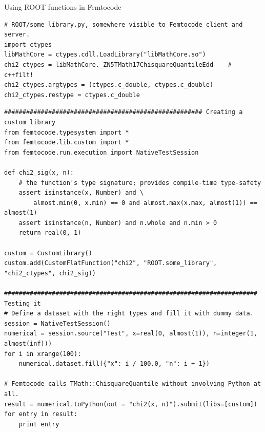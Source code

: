 \documentclass{beamer}
\begin{document}
\begin{frame}[fragile]{Using ROOT functions in Femtocode}
\vspace{0.2 cm}
\tiny
\begin{verbatim}
# ROOT/some_library.py, somewhere visible to Femtocode client and server.
import ctypes
libMathCore = ctypes.cdll.LoadLibrary("libMathCore.so")
chi2_ctypes = libMathCore._ZN5TMath17ChisquareQuantileEdd    # c++filt!
chi2_ctypes.argtypes = (ctypes.c_double, ctypes.c_double)
chi2_ctypes.restype = ctypes.c_double
\end{verbatim}

\begin{verbatim}
###################################################### Creating a custom library
from femtocode.typesystem import *
from femtocode.lib.custom import *
from femtocode.run.execution import NativeTestSession

def chi2_sig(x, n):
    # the function's type signature; provides compile-time type-safety
    assert isinstance(x, Number) and \
        almost.min(0, x.min) == 0 and almost.max(x.max, almost(1)) == almost(1)
    assert isinstance(n, Number) and n.whole and n.min > 0
    return real(0, 1)

custom = CustomLibrary()
custom.add(CustomFlatFunction("chi2", "ROOT.some_library", "chi2_ctypes", chi2_sig))

##################################################################### Testing it
# Define a dataset with the right types and fill it with dummy data.
session = NativeTestSession()
numerical = session.source("Test", x=real(0, almost(1)), n=integer(1, almost(inf)))
for i in xrange(100):
    numerical.dataset.fill({"x": i / 100.0, "n": i + 1})

# Femtocode calls TMath::ChisquareQuantile without involving Python at all.
result = numerical.toPython(out = "chi2(x, n)").submit(libs=[custom])
for entry in result:
    print entry
\end{verbatim}
\end{frame}
\end{document}
